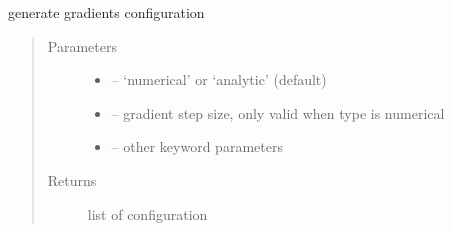 \documentclass[letterpaper,10pt,english]{sphinxmanual}
\begin{document}
\begin{fulllineitems}

\begin{fulllineitems}
\label{\detokenize{src/apidocs/dakutils:genopt.dakutils.DakotaResponses.gradients}}
generate gradients configuration
\begin{quote}\begin{description}
\item[{Parameters}] \leavevmode\begin{itemize}
\item {} 
 -- `numerical' or `analytic' (default)

\item {} 
 -- gradient step size, only valid when type is numerical

\item {} 
 -- other keyword parameters

\end{itemize}

\item[{Returns}] \leavevmode
list of configuration

\end{description}\end{quote}

\end{fulllineitems}


\end{fulllineitems}

\end{document}
